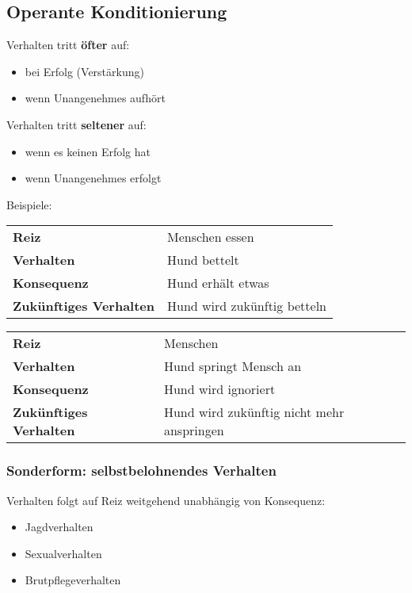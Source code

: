     \subsection{Operante Konditionierung}
        Verhalten tritt \textbf{öfter} auf:
        \begin{itemize}
            \item bei Erfolg (Verstärkung)
            \item wenn Unangenehmes aufhört
        \end{itemize}

        Verhalten tritt \textbf{seltener} auf:
        \begin{itemize}
            \item wenn es keinen Erfolg hat
            \item wenn Unangenehmes erfolgt
        \end{itemize}

        Beispiele: \\
        \begin{tabular}{l|l}
            \textbf{Reiz}                   & Menschen essen \\
            \textbf{Verhalten}              & Hund bettelt \\
            \textbf{Konsequenz}             & Hund erhält etwas \\
            \textbf{Zukünftiges Verhalten}  & Hund wird zukünftig betteln \\
        \end{tabular}

        \begin{tabular}{l|l}
            \textbf{Reiz}                   & Menschen \\
            \textbf{Verhalten}              & Hund springt Mensch an \\
            \textbf{Konsequenz}             & Hund wird ignoriert \\
            \textbf{Zukünftiges Verhalten}  & Hund wird zukünftig nicht mehr anspringen \\
        \end{tabular}

        \subsubsection{Sonderform: selbstbelohnendes Verhalten}
            Verhalten folgt auf Reiz weitgehend unabhängig von Konsequenz:
            \begin{itemize}
                \item Jagdverhalten
                \item Sexualverhalten
                \item Brutpflegeverhalten
            \end{itemize}


